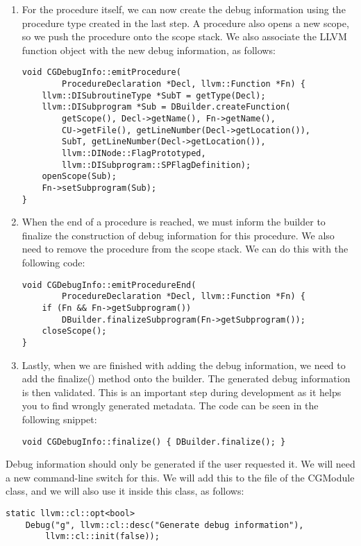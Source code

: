 \begin{enumerate}
\item For the procedure itself, we can now create the debug information using the procedure type created in the last step. A procedure also opens a new scope, so we push the procedure onto the scope stack. We also associate the LLVM function object with the new debug information, as follows:
\begin{lstlisting}[caption={}]
void CGDebugInfo::emitProcedure(
		ProcedureDeclaration *Decl, llvm::Function *Fn) {
	llvm::DISubroutineType *SubT = getType(Decl);
	llvm::DISubprogram *Sub = DBuilder.createFunction(
		getScope(), Decl->getName(), Fn->getName(),
		CU->getFile(), getLineNumber(Decl->getLocation()),
		SubT, getLineNumber(Decl->getLocation()),
		llvm::DINode::FlagPrototyped,
		llvm::DISubprogram::SPFlagDefinition);
	openScope(Sub);
	Fn->setSubprogram(Sub);
}
\end{lstlisting}

\item When the end of a procedure is reached, we must inform the builder to finalize the construction of debug information for this procedure. We also need to remove the procedure from the scope stack. We can do this with the following code:
\begin{lstlisting}[caption={}]
void CGDebugInfo::emitProcedureEnd(
		ProcedureDeclaration *Decl, llvm::Function *Fn) {
	if (Fn && Fn->getSubprogram())
		DBuilder.finalizeSubprogram(Fn->getSubprogram());
	closeScope();
}
\end{lstlisting}

\item Lastly, when we are finished with adding the debug information, we need to add the finalize() method onto the builder. The generated debug information is then validated. This is an important step during development as it helps you to find wrongly generated metadata. The code can be seen in the following snippet:
\begin{lstlisting}[caption={}]
void CGDebugInfo::finalize() { DBuilder.finalize(); }
\end{lstlisting}

\end{enumerate}

Debug information should only be generated if the user requested it. We will need a new command-line switch for this. We will add this to the file of the CGModule class, and we will also use it inside this class, as follows:\par

\begin{lstlisting}[caption={}]
static llvm::cl::opt<bool>
	Debug("g", llvm::cl::desc("Generate debug information"),
		llvm::cl::init(false));
\end{lstlisting}

